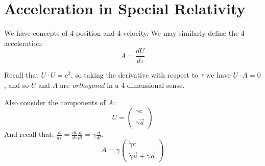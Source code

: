 \documentclass[../Main.tex]{subfiles}
\begin{document}
\section{Acceleration in Special Relativity}
We have concepts of 4-position and 4-velocity. We may similarly define the 4-acceleration:
\begin{equation}
    A = \frac{dU}{d\tau}
    \label{eqnRelativityAccel}
\end{equation}
\begin{remark}
    Recall that $U \cdot U = c^2$, so taking the derivative with respect to $\tau$ we have $U \cdot A = 0$, and so $U$ and $A$ are \textit{orthogonal} in a 4-dimensional sense.
\end{remark}
Also consider the components of $A$:
\begin{equation*}
    U = \begin{pmatrix}\gamma c \\ \gamma \vec{u}\end{pmatrix}
\end{equation*}
And recall that: $\frac{d}{d\tau} = \frac{dt}{d\tau}\frac{d}{dt} = \gamma \frac{d}{dt}$.
\begin{equation*}
    A = \gamma
    \begin{pmatrix}
        \dot{\gamma} c \\
        \dot{\gamma} \vec{u} + \gamma \vec{a}
    \end{pmatrix}
\end{equation*}
\end{document}
